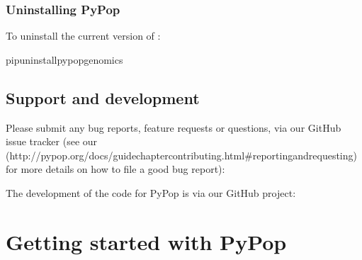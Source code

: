 \documentclass[letterpaper,10pt,english,openany,oneside]{sphinxmanual}
\begin{document}
\subsection{Uninstalling PyPop}
\label{\detokenize{docs/guide-chapter-install:uninstalling-pypop}}
\sphinxAtStartPar
To uninstall the current version of :

\begin{sphinxVerbatim}[commandchars=\\\{\}]
pipuninstallpypop\PYGZhy{}genomics
\end{sphinxVerbatim}


\section{Support and development}
\label{\detokenize{docs/guide-chapter-install:support-and-development}}
\sphinxAtStartPar
Please submit any bug reports, feature requests or questions, via our
GitHub issue tracker (see our  (http://pypop.org/docs/guide\sphinxhyphen{}chapter\sphinxhyphen{}contributing.html\#reporting\sphinxhyphen{}and\sphinxhyphen{}requesting)
for more details on how to file a good bug report):
\begin{quote}

\sphinxAtStartPar
{}
\end{quote}

\sphinxAtStartPar
{}

\sphinxAtStartPar
The development of the code for PyPop is via our GitHub project:
\begin{quote}

\sphinxAtStartPar
{}
\end{quote}

\sphinxstepscope


\chapter{Getting started with PyPop}
\label{\detokenize{docs/guide-chapter-usage:getting-started-with-pypop}}\label{\detokenize{docs/guide-chapter-usage::doc}}
\end{document}

